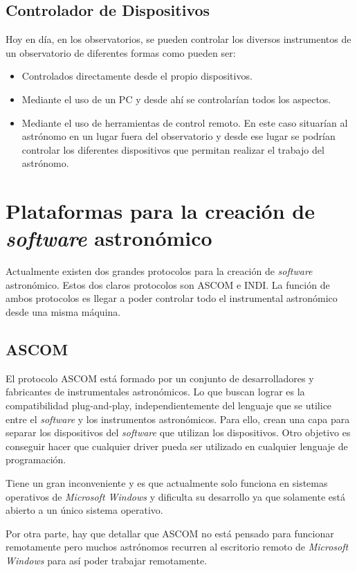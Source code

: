\subsection{Controlador de Dispositivos}
Hoy en día, en los observatorios, se pueden controlar los diversos instrumentos de un observatorio de diferentes formas como pueden ser:

  \begin{itemize}
    \item Controlados directamente desde el propio dispositivos.
    \item Mediante el uso de un PC y desde ahí se controlarían todos los aspectos.
    \item Mediante el uso de herramientas de control remoto. En este caso situarían al astrónomo en un lugar fuera del observatorio y desde ese lugar se podrían controlar los diferentes dispositivos que permitan realizar el trabajo del astrónomo.
  \end{itemize}


\section{Plataformas para la creación de \textit{software} astronómico}
Actualmente existen dos grandes protocolos para la creación de \textit{software} astronómico. Estos dos claros protocolos son ASCOM e INDI.  La función de ambos protocolos es llegar a poder controlar  todo el instrumental astronómico desde una misma máquina.

\subsection{ASCOM}
El protocolo ASCOM está formado por un conjunto de desarrolladores y fabricantes de instrumentales astronómicos. Lo que buscan lograr es la compatibilidad plug-and-play, independientemente del lenguaje que se utilice entre el \textit{software} y los instrumentos astronómicos. Para ello, crean una capa para separar los dispositivos del \textit{software} que utilizan los dispositivos. Otro objetivo es conseguir hacer que cualquier driver pueda ser utilizado en cualquier lenguaje de programación.

Tiene un gran inconveniente y es que actualmente solo funciona en sistemas operativos de \textit{Microsoft Windows} y dificulta su desarrollo ya que solamente está abierto a un único sistema operativo.

Por otra parte, hay que detallar que ASCOM no está pensado para funcionar remotamente pero muchos astrónomos recurren al escritorio remoto de \textit{Microsoft Windows} para así poder trabajar remotamente.\cite{ASCOM}


